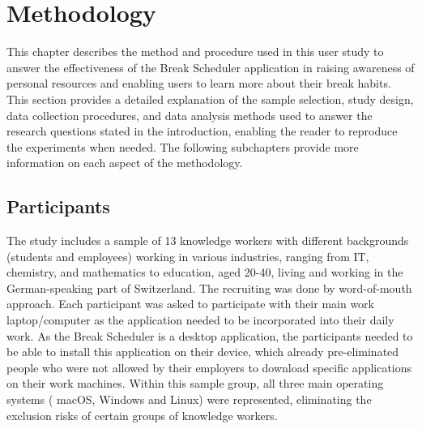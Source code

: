 \documentclass{hasel_thesis}
\begin{document}
\chapter{Methodology}
This chapter describes the method and procedure used in this user study to answer the effectiveness of the Break Scheduler application in raising awareness of personal resources and enabling users to learn more about their break habits. This section provides a detailed explanation of the sample selection, study design, data collection procedures, and data analysis methods used to answer the research questions stated in the introduction, enabling the reader to reproduce the experiments when needed. The following subchapters provide more information on each aspect of the methodology.

\section{Participants}

 The study includes a sample of 13 knowledge workers with different backgrounds (students and employees) working in various industries, ranging from IT, chemistry, and mathematics to education, aged 20-40, living and working in the German-speaking part of Switzerland. The recruiting was done by word-of-mouth approach. Each participant was asked to participate with their main work laptop/computer as the application needed to be incorporated into their daily work. As the Break Scheduler is a desktop application, the participants needed to be able to install this application on their device, which already pre-eliminated people who were not allowed by their employers to download specific applications on their work machines. Within this sample group, all three main operating systems ( macOS, Windows and Linux) were represented, eliminating the exclusion risks of certain groups of knowledge workers.
\end{document}
